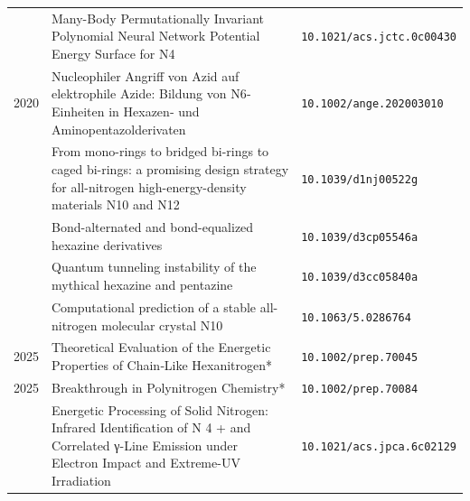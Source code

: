 \begin{longtable}{@{}p{1.0cm}p{10.5cm}p{3.5cm}@{}}
\addlinespace
2020 & Many-Body Permutationally Invariant Polynomial Neural Network Potential Energy Surface for N4 & \small\texttt{10.1021/acs.jctc.0c00430} \\
2020 & Nucleophiler Angriff von Azid auf elektrophile Azide: Bildung von N6‐Einheiten in Hexazen‐ und Aminopentazolderivaten & \small\texttt{10.1002/ange.202003010} \\
\addlinespace
2021 & From mono-rings to bridged bi-rings to caged bi-rings: a promising design strategy for all-nitrogen high-energy-density materials N10 and N12 & \small\texttt{10.1039/d1nj00522g} \\
\addlinespace
2023 & Bond-alternated and bond-equalized hexazine derivatives & \small\texttt{10.1039/d3cp05546a} \\
\addlinespace
2024 & Quantum tunneling instability of the mythical hexazine and pentazine & \small\texttt{10.1039/d3cc05840a} \\
\addlinespace
2025 & Computational prediction of a stable all-nitrogen molecular crystal N10 & \small\texttt{10.1063/5.0286764} \\
2025 & Theoretical Evaluation of the Energetic Properties of Chain‐Like Hexanitrogen* & \small\texttt{10.1002/prep.70045} \\
2025 & Breakthrough in Polynitrogen Chemistry* & \small\texttt{10.1002/prep.70084} \\
\addlinespace
2026 & Energetic Processing of Solid Nitrogen: Infrared Identification of N 4 + and Correlated γ-Line Emission under Electron Impact and Extreme-UV Irradiation & \small\texttt{10.1021/acs.jpca.6c02129} \\
\end{longtable}
